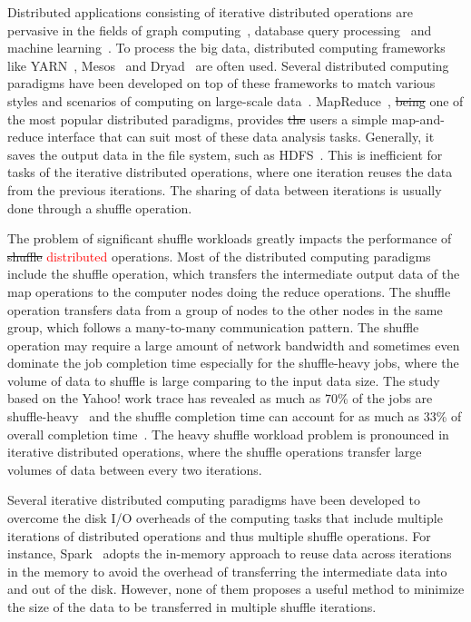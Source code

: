 \documentclass[10pt,journal,compsoc]{IEEEtran}
\newcommand{\red}[1]{\textcolor{red}{#1}}
\begin{document}
Distributed applications consisting of iterative distributed operations are pervasive in the fields of graph computing~\cite{Malewicz:2010:PSL, Lu:2014:LDG}, database query processing~\cite{thusoo2009hive,Yu:2008:DSG,Armbrust:2015:SSR} and machine learning~\cite{low2012distributed,kraska2013mlbase}.
To process the big data,
distributed computing frameworks like YARN~\cite{vavilapalli2013apache},
Mesos~\cite{hindman2011mesos} and Dryad~\cite{isard2007dryad} are often used.
Several distributed computing paradigms have been developed on top of
these frameworks to match various styles and
scenarios of computing on large-scale data~\cite{thusoo2009hive, Yu:2008:DSG}.
MapReduce~\cite{dean2008mapreduce}, \st{being} one of the most popular
distributed paradigms, provides \st{the} users a simple map-and-reduce
interface that can suit most of these data analysis tasks.
Generally, it saves the output data in the file system, such as HDFS~\cite{shvachko2010hadoop}. 
This is inefficient for tasks of the iterative distributed operations, where one iteration reuses the data from the previous iterations. The sharing of data between iterations is usually done
through a shuffle operation.

The problem of significant shuffle workloads greatly impacts the performance of \st{shuffle} \red{distributed} operations. 
Most of the distributed computing paradigms include the shuffle
operation, which transfers the intermediate output data of the map
operations to the computer nodes doing the reduce operations.
The shuffle operation transfers data from a group of nodes to the other
nodes in the same group, which follows a many-to-many communication
pattern.
The shuffle operation may require a large amount of network bandwidth
and sometimes even dominate the job completion time especially for the
shuffle-heavy jobs, where the volume of data to shuffle is large
comparing to the input data size.
The study based on the Yahoo! work trace has revealed as much as 70\% of the
jobs are shuffle-heavy~\cite{chen2011case} and the shuffle completion
time can account for as much as 33\% of overall completion time~\cite{chowdhury2011managing, al2010hedera}.
The heavy shuffle workload problem is pronounced in iterative distributed operations, 
where the shuffle operations transfer large volumes of data between every two iterations. 


Several iterative distributed computing paradigms \cite{bu2010haloop,
zaharia2012resilient} have been developed to overcome the disk I/O
overheads of the computing tasks that include multiple iterations of
distributed operations and thus multiple shuffle operations.
For instance, Spark~\cite{zaharia2012resilient} adopts the in-memory approach 
to reuse data across iterations in the memory to avoid the overhead of transferring the intermediate data into and out of the disk. 
However, none of them proposes a useful method to minimize the size of
the data to be transferred in multiple shuffle iterations.
\end{document}
